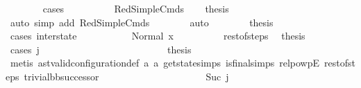 \begin{isabellebody}
\ \ \ \ \ \ \isamarkupfalse%
\ cases\isanewline
\ \ \ \ \ \ \ \ \isamarkupfalse%
\ RedSimpleCmds\ \isamarkupfalse%
\ \isamarkupfalse%
\ {\isacharquery}{\kern0pt}thesis\ \isamarkupfalse%
\ {\isacharparenleft}{\kern0pt}auto\ simp\ add{\isacharcolon}{\kern0pt}\ RedSimpleCmds{\isacharparenright}{\kern0pt}\isanewline
\ \ \ \ \ \ \isamarkupfalse%
\ auto\isanewline
\isanewline
\ \ \ \ \ \ \isamarkupfalse%
\ {\isacharquery}{\kern0pt}thesis\ \isanewline
\ \ \ \ \ \ \isamarkupfalse%
\ {\isacharparenleft}{\kern0pt}cases\ inter{\isacharunderscore}{\kern0pt}state{\isacharparenright}{\kern0pt}\isanewline
\ \ \ \ \ \ \ \ \isamarkupfalse%
\ {}{\isacharcolon}{\kern0pt}\ {\isacharparenleft}{\kern0pt}Normal\ x{}{\isacharparenright}{\kern0pt}\isanewline
\ \ \ \ \ \ \ \ \isamarkupfalse%
\ rest{\isacharunderscore}{\kern0pt}of{\isacharunderscore}{\kern0pt}steps\ \isamarkupfalse%
\ {\isacharquery}{\kern0pt}thesis\ \isanewline
\ \ \ \ \ \ \ \ \isamarkupfalse%
\ {\isacharparenleft}{\kern0pt}cases\ j{\isacharprime}{\kern0pt}{\isacharparenright}{\kern0pt}\isanewline
\ \ \ \ \ \ \ \ \ \ \isamarkupfalse%
\ {}\isanewline
\ \ \ \ \ \ \ \ \ \ \isamarkupfalse%
\ \isamarkupfalse%
\ {\isacharquery}{\kern0pt}thesis\ \isanewline
\ \ \ \ \ \ \ \ \ \ \ \ \isamarkupfalse%
\ {\isacharparenleft}{\kern0pt}metis\ ast{\isacharunderscore}{\kern0pt}valid{\isacharunderscore}{\kern0pt}configuration{\isacharunderscore}{\kern0pt}def\ a{}\ a{}\ get{\isacharunderscore}{\kern0pt}state{\isachardot}{\kern0pt}simps\ is{\isacharunderscore}{\kern0pt}final{\isachardot}{\kern0pt}simps{\isacharparenleft}{\kern0pt}{}{\isacharparenright}{\kern0pt}\ relpowp{\isacharunderscore}{\kern0pt}{}{\isacharunderscore}{\kern0pt}E\ rest{\isacharunderscore}{\kern0pt}of{\isacharunderscore}{\kern0pt}steps\ trivial{\isacharunderscore}{\kern0pt}bb{\isacharunderscore}{\kern0pt}successor{\isacharparenright}{\kern0pt}\isanewline
\ \ \ \ \ \ \ \ \isamarkupfalse%
\isanewline
\ \ \ \ \ \ \ \ \ \ \isamarkupfalse%
\ {}{\isacharcolon}{\kern0pt}\ {\isacharparenleft}{\kern0pt}Suc\ j{\isacharprime}{\kern0pt}{\isacharprime}{\kern0pt}{\isacharparenright}{\kern0pt}\isanewline
\ \ \ \ \ \ \ \ \ \ \isamarkupfalse%

\end{isabellebody}
